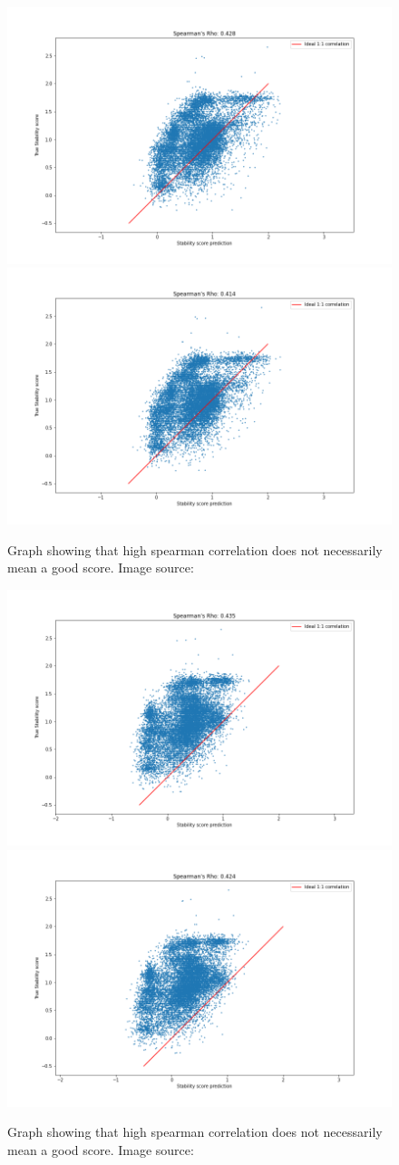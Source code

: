 \begin{figure}[!ht]
  \centering
  \includegraphics[width=0.4\linewidth]{latex/imgs/spearman_1_layer_with_schedule_512_final.png}
  \includegraphics[width=0.4\linewidth]{latex/imgs/spearman_1_layer_with_schedule_512_minloss.png}
  \caption{Graph showing that high spearman correlation does not necessarily mean a good score. Image source:\cite{spearman}}
\end{figure}
\begin{figure}[!ht]
  \centering
  \includegraphics[width=0.4\linewidth]{latex/imgs/spearman_1_layer_with_schedule_256_final.png}
  \includegraphics[width=0.4\linewidth]{latex/imgs/spearman_1_layer_with_schedule_256_minloss.png}
  \caption{Graph showing that high spearman correlation does not necessarily mean a good score. Image source:\cite{spearman}}
\end{figure}
